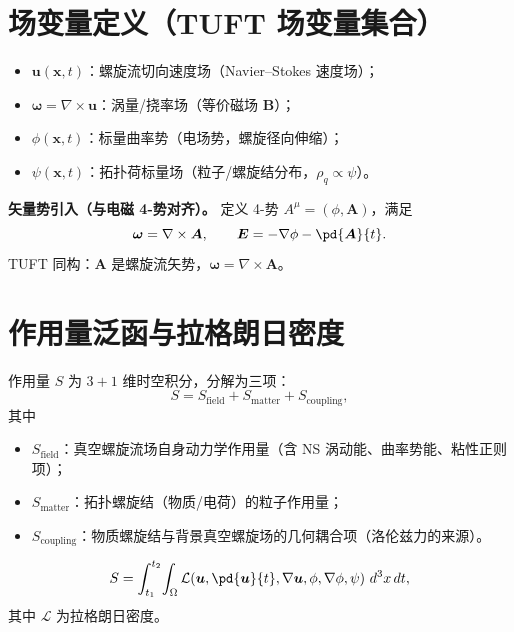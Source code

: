 \documentclass[11pt]{ctexart}
\newcommand{\ve}[1]{\bm{#1}}                         %
\newcommand{\Ltot}{\mathcal{L}}                      %
\begin{document}
\section{场变量定义（TUFT 场变量集合）}

\begin{itemize}
\item $\ve{u}(\ve{x},t)$：螺旋流切向速度场（Navier--Stokes 速度场）；
\item $\ve{\omega}=\nabla\times\ve{u}$：涡量/挠率场（等价磁场 $\ve{B}$）；
\item $\phi(\ve{x},t)$：标量曲率势（电场势，螺旋径向伸缩）；
\item $\psi(\ve{x},t)$：拓扑荷标量场（粒子/螺旋结分布，$\rho_q\propto\psi$）。
\end{itemize}

\noindent\textbf{矢量势引入（与电磁 4-势对齐）。}
定义 4-势 $A^{\mu}=(\phi,\ve{A})$，满足
\begin{equation}
\ve{\omega}=\nabla\times\ve{A},\qquad
\ve{E}=-\nabla\phi-\pd{\ve{A}}{t}.
\label{eq:4pot}
\end{equation}
TUFT 同构：$\ve{A}$ 是螺旋流矢势，$\ve{\omega}=\nabla\times\ve{A}$。

\section{作用量泛函与拉格朗日密度}

作用量 $S$ 为 $3+1$ 维时空积分，分解为三项：
\begin{equation}
S=S_{\mathrm{field}}+S_{\mathrm{matter}}+S_{\mathrm{coupling}},
\label{eq:Sdecomp}
\end{equation}
其中
\begin{itemize}
\item $S_{\mathrm{field}}$：真空螺旋流场自身动力学作用量（含 NS 涡动能、曲率势能、粘性正则项）；
\item $S_{\mathrm{matter}}$：拓扑螺旋结（物质/电荷）的粒子作用量；
\item $S_{\mathrm{coupling}}$：物质螺旋结与背景真空螺旋场的几何耦合项（洛伦兹力的来源）。
\end{itemize}
\begin{equation}
S=\int_{t_1}^{t_2}\!\int_{\Omega}
\Ltot\!\left(\ve{u},\pd{\ve{u}}{t},\nabla\ve{u},\phi,\nabla\phi,\psi\right)\,d^{3}x\,dt,
\label{eq:Saction}
\end{equation}
其中 $\Ltot$ 为拉格朗日密度。
\end{document}
